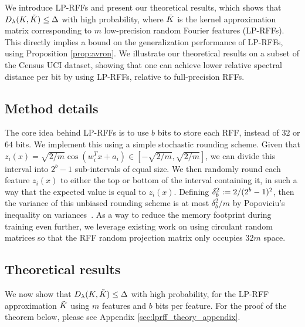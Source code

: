 We introduce LP-RFFs and present our theoretical results, which shows that $D_{\lambda}(K,\tilde{K}) \leq \Delta$ with high probability, where $\tilde{K}$ is the kernel approximation matrix corresponding to $m$ low-precision random Fourier features (LP-RFFs). This directly implies a bound on the generalization performance of LP-RFFs, using Proposition \ref{prop:avron}. We illustrate our theoretical results on a subset of the Census UCI dataset, showing that one can achieve lower relative spectral distance per bit by using LP-RFFs, relative to full-precision RFFs. \vsp

\subsection{Method details}
\label{subsec:method_details}
The core idea behind LP-RFFs is to use $b$ bits to store each RFF, instead of $32$ or $64$ bits. We implement this using a simple stochastic rounding scheme. Given that $z_i(x) = \sqrt{2/m}\cos(w_i^T x + a_i) \in [-\sqrt{2/m},\sqrt{2/m}]$, we can divide this interval into $2^b - 1$ sub-intervals of equal size. We then randomly round each feature $z_i(x)$ to either the top or bottom of the interval containing it, in such a way that the expected value is equal to $z_i(x)$. Defining $\delta_b^2 := 2/(2^b-1)^2$, then the variance of this unbiased rounding scheme is at most $\delta_b^2/m$ by Popoviciu's inequality on variances~\cite{popoviciu1935equations}.  As a way to reduce the memory footprint during training even further, we leverage existing work on using circulant random matrices \citep{yu15} so that the RFF random projection matrix only occupies $32m$ space. \vsp

\subsection{Theoretical results}

We now show that $D_{\lambda}(K,\tilde{K}) \leq \Delta$ with high probability, for the LP-RFF approximation $\tilde{K}$ using $m$ features and $b$ bits per feature.  For the proof of the theorem below, please see Appendix \ref{sec:lprff_theory_appendix}.

